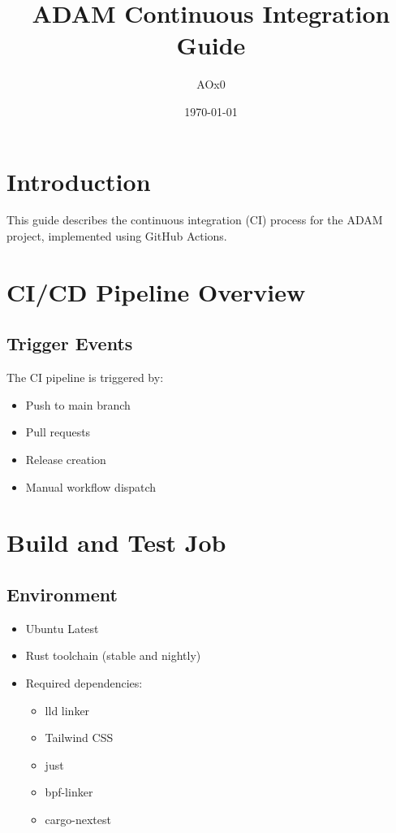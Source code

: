 \documentclass{article}
\title{ADAM Continuous Integration Guide}
\author{AOx0}
\date{\today}
\begin{document}
\maketitle

\section{Introduction}
This guide describes the continuous integration (CI) process for the ADAM project, implemented using GitHub Actions.

\section{CI/CD Pipeline Overview}

\subsection{Trigger Events}
The CI pipeline is triggered by:
\begin{itemize}
    \item Push to main branch
    \item Pull requests
    \item Release creation
    \item Manual workflow dispatch
\end{itemize}

\section{Build and Test Job}

\subsection{Environment}
\begin{itemize}
    \item Ubuntu Latest
    \item Rust toolchain (stable and nightly)
    \item Required dependencies:
    \begin{itemize}
        \item lld linker
        \item Tailwind CSS
        \item just
        \item bpf-linker
        \item cargo-nextest
    \end{itemize}
\end{itemize}
\end{document}
